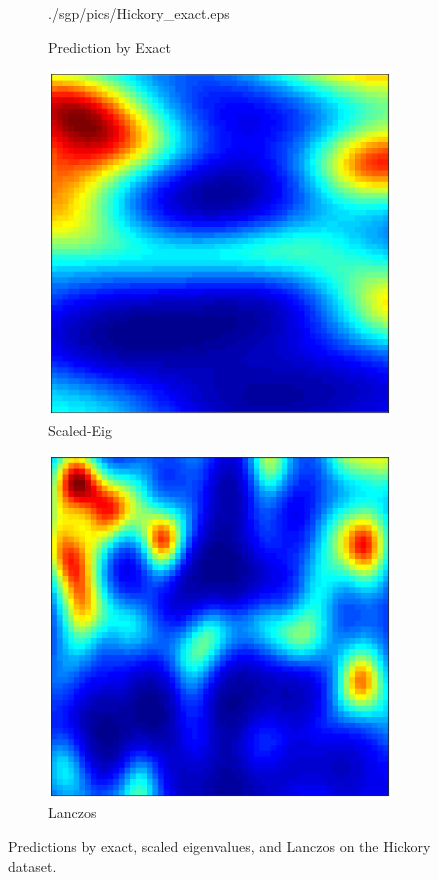 \begin{figure}[ht]
\begin{center}
\begin{subfigure}{0.3\textwidth}
      {./sgp/pics/Hickory_exact.eps}
      \caption{Prediction by Exact}\label{fig:hickory_exact}
    \end{subfigure}
    \linebreak
    \begin{subfigure}{0.3\textwidth}
      \centering
      \includegraphics[height=0.87\textwidth,trim = 1cm 1cm 1cm 1cm,clip]
      {./sgp/pics/Hickory_ski.eps}
      \caption{Scaled\hyp{}Eig}\label{fig:hickory_ski}
    \end{subfigure}
    \hspace{1cm}
    \begin{subfigure}{0.3\textwidth}
      \centering
      \includegraphics[height=0.87\textwidth,trim = 1cm 1cm 1cm 1cm,clip]
      {./sgp/pics/Hickory_lan.eps}
      \caption{Lanczos}\label{fig:hickory_lan}
    \end{subfigure}
    \caption{Predictions by exact, scaled eigenvalues, and Lanczos on the Hickory dataset.}\label{fig:hickory}
  \end{center}
\end{figure}

